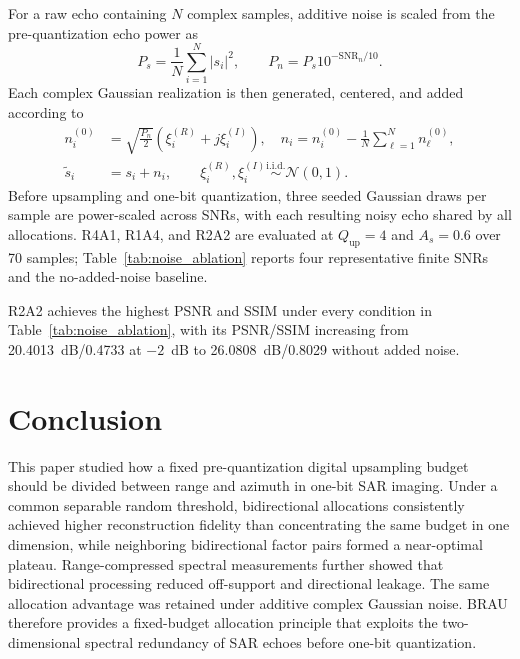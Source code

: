 \documentclass[conference]{IEEEtran}
\begin{document}
For a raw echo containing $N$ complex samples, additive noise is scaled from the pre-quantization echo power as
\begin{equation}
    P_s=\frac{1}{N}\sum_{i=1}^{N}|s_i|^2,\qquad
    P_n=P_s10^{-\mathrm{SNR}_{n}/10}.
\end{equation}
Each complex Gaussian realization is then generated, centered, and added according to
\begin{equation}
    \begin{aligned}
        n_i^{(0)}&=\sqrt{\frac{P_n}{2}}\left(\xi_i^{(R)}+j\xi_i^{(I)}\right),\quad
        n_i=n_i^{(0)}-\frac{1}{N}\sum_{\ell=1}^{N}n_\ell^{(0)},\\
        \widetilde{s}_i&=s_i+n_i,\qquad
        \xi_i^{(R)},\xi_i^{(I)}\overset{\mathrm{i.i.d.}}{\sim}\mathcal{N}(0,1).
    \end{aligned}
\end{equation}
Before upsampling and one-bit quantization, three seeded Gaussian draws per sample are power-scaled across SNRs, with each resulting noisy echo shared by all allocations. R4A1, R1A4, and R2A2 are evaluated at $Q_{\mathrm{up}}=4$ and $A_s=0.6$ over 70 samples; Table~\ref{tab:noise_ablation} reports four representative finite SNRs and the no-added-noise baseline.

R2A2 achieves the highest PSNR and SSIM under every condition in Table~\ref{tab:noise_ablation}, with its PSNR/SSIM increasing from 20.4013~dB/0.4733 at $-2$~dB to 26.0808~dB/0.8029 without added noise.

\section{Conclusion}

This paper studied how a fixed pre-quantization digital upsampling budget should be divided between range and azimuth in one-bit SAR imaging. Under a common separable random threshold, bidirectional allocations consistently achieved higher reconstruction fidelity than concentrating the same budget in one dimension, while neighboring bidirectional factor pairs formed a near-optimal plateau. Range-compressed spectral measurements further showed that bidirectional processing reduced off-support and directional leakage. The same allocation advantage was retained under additive complex Gaussian noise. BRAU therefore provides a fixed-budget allocation principle that exploits the two-dimensional spectral redundancy of SAR echoes before one-bit quantization.
\end{document}

